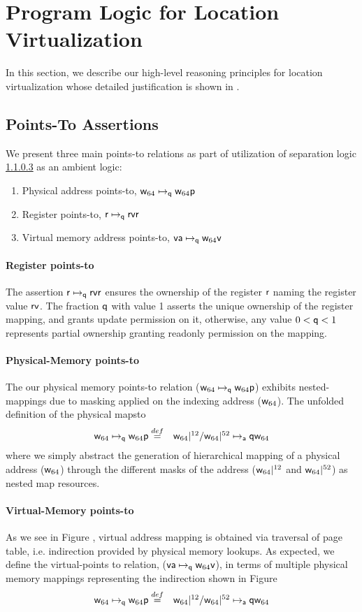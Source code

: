 \section{Program Logic for Location Virtualization}
\label{sec:logic}
In this section, we describe our high-level reasoning principles for location virtualization whose detailed justification is shown in . 
\subsection{Points-To Assertions}
\label{sec:pointsto}

We present three main points-to relations as part of utilization of separation logic \ref{} as an ambient logic:
\begin{enumerate}
\item Physical address points-to, $\mathsf{w}_{64}\mapsto_{\mathsf{q}}{\mathsf{w}_{64}}\mathsf{p}$
\item Register points-to, $\mathsf{r}\mapsto_{\mathsf{q}}{\mathsf{rv}}\mathsf{r}$
\item Virtual memory address points-to, $\mathsf{va}\mapsto_{\mathsf{q}}{\mathsf{w}_{64}}\mathsf{v}$
\end{enumerate}
\paragraph{Register points-to} The assertion $\mathsf{r}\mapsto_{\mathsf{q}}{\mathsf{rv}}\mathsf{r}$ ensures the ownership of the register $\mathsf{r}$ naming the register value $\mathsf{rv}$. The fraction $\mathsf{q}$ with value 1 asserts the unique ownership of the register mapping, and grants update permission on it, otherwise, any value $0 < \mathsf{q} <1$ represents partial ownership granting readonly permission on the mapping.
\paragraph{Physical-Memory points-to} The our physical memory points-to relation ($\mathsf{w}_{64}\mapsto_{\mathsf{q}}{\mathsf{w}_{64}}\mathsf{p}$) exhibits nested-mappings due to masking applied on the indexing address ($\mathsf{w}_{64}$). The unfolded definition of the physical mapsto 
\[
\begin{array}{cl}
\mathsf{w}_{64}\mapsto_{\mathsf{q}}{\mathsf{w}_{64}}\mathsf{p} \stackrel{def}{=} & \mathsf{w}_{64}|^{12} / \mathsf{w}_{64}|^{52} \mapsto_{\mathsf{a}}{\mathsf{q}}\mathsf{w}_{64}
\end{array}
\]
where we simply abstract the generation of hierarchical mapping of a physical address ($\mathsf{w}_{64}$) through the different masks of the address ($\mathsf{w}_{64}|^{12}$ and $\mathsf{w}_{64}|^{52}$) as nested map resources.
\paragraph{Virtual-Memory points-to} As we see in Figure , virtual address mapping is obtained via traversal of page table, i.e. indirection provided by physical memory lookups. As expected, we define the virtual-points to relation, ($\mathsf{va}\mapsto_{\mathsf{q}}{\mathsf{w}_{64}}\mathsf{v}$), in terms of multiple physical memory mappings representing the indirection shown in Figure 
\[
\begin{array}{cl}
\mathsf{w}_{64}\mapsto_{\mathsf{q}}{\mathsf{w}_{64}}\mathsf{p} \stackrel{def}{=} & \mathsf{w}_{64}|^{12} / \mathsf{w}_{64}|^{52} \mapsto_{\mathsf{a}}{\mathsf{q}}\mathsf{w}_{64}
\end{array}
\]
